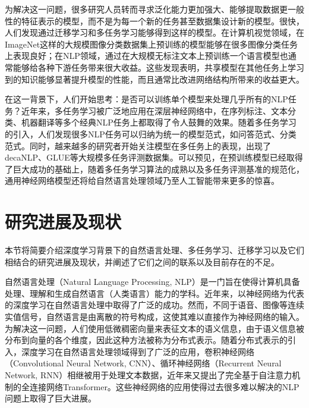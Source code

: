为解决这一问题，很多研究人员转而寻求泛化能力更加强大、能够提取数据更一般性的特征表示的模型，而不是为每一个新的任务甚至数据集设计新的模型。很快，人们发现通过迁移学习和多任务学习能够得到这样的模型。在计算机视觉领域，在ImageNet这样的大规模图像分类数据集上预训练的模型能够在很多图像分类任务上表现良好；在NLP领域，通过在大规模无标注文本上预训练一个语言模型也通常能够给各种下游任务带来很大收益。这些发现表明，共享模型在其他任务上学习到的知识能够显著提升模型的性能，而且通常比改进网络结构所带来的收益更大。

在这一背景下，人们开始思考：是否可以训练单个模型来处理几乎所有的NLP任务？近年来，多任务学习被广泛地应用在深层神经网络中，在序列标注、文本分类、机器翻译等多个经典NLP任务上都取得了令人鼓舞的效果。随着多任务学习的引入，人们发现很多NLP任务可以归纳为统一的模型范式，如问答范式\cite{mccann2018natural}、分类范式\cite{radford2018improving}\cite{devlin2018bert}。同时，越来越多的研究者开始关注模型在多任务上的表现，出现了decaNLP\cite{mccann2018natural}、GLUE\cite{DBLP:conf/emnlp/WangSMHLB18}等大规模多任务评测数据集。可以预见，在预训练模型已经取得了巨大成功的基础上，随着多任务学习算法的成熟以及多任务评测基准的规范化，通用神经网络模型还将给自然语言处理领域乃至人工智能带来更多的惊喜。

\section{研究进展及现状}

本节将简要介绍深度学习背景下的自然语言处理、多任务学习、迁移学习以及它们相结合的研究进展及现状，并阐述了它们之间的联系以及目前存在的不足。

自然语言处理（Natural Language Processing, NLP）是一门旨在使得计算机具备处理、理解和生成自然语言（人类语言）能力的学科。近年来，以神经网络为代表的深度学习在自然语言处理\cite{DBLP:journals/jmlr/CollobertWBKKK11}\cite{DBLP:conf/emnlp/BordesCW14}\cite{DBLP:conf/acl/JeanCMB15}\cite{DBLP:conf/nips/SutskeverVL14}中取得了广泛的成功。然而，不同于语音、图像等连续实值信号，自然语言是由离散的符号构成，这使其难以直接作为神经网络的输入。为解决这一问题，人们使用低微稠密向量来表征文本的语义信息\cite{DBLP:conf/nips/MikolovSCCD13}\cite{DBLP:conf/emnlp/PenningtonSM14}，由于语义信息被分布到向量的各个维度，因此这种方法被称为分布式表示。随着分布式表示的引入，深度学习在自然语言处理领域得到了广泛的应用，卷积神经网络（Convolutional Neural Network, CNN）、循环神经网络（Recurrent Neural Network, RNN）相继被用于处理文本数据，近年来又提出了完全基于自注意力机制的全连接网络Transformer。这些神经网络的应用使得过去很多难以解决的NLP问题上取得了巨大进展。

